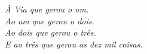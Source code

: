 \begin{dedicatoria}
   \vspace*{\fill}
   \vspace*{\fill}
   \vspace*{\fill}
   \vspace*{\fill}
   \vspace*{\fill}
   \vspace*{\fill}
   \vspace*{\fill}
   \vspace*{\fill}
   \vspace*{\fill}
   \vspace*{\fill}
   \vspace*{\fill}
   \vspace*{\fill}
   \begin{center}\textit{À Via que gerou o um.\\Ao um que gerou o dois.\\Ao dois que gerou o três.\\E ao tr\^es que gerou as dez mil coisas.}\end{center}
   \vspace*{\fill}
   \vspace*{\fill}
   \vspace*{\fill}
   \vspace*{\fill}
   \vspace*{\fill}
   \vspace*{\fill}
   \vspace*{\fill}
   \vspace*{\fill}
   \vspace*{\fill}
   \vspace*{\fill}
   \vspace*{\fill}
   \vspace*{\fill}
   \vspace*{\fill}
   \vspace*{\fill}
   \vspace*{\fill}
   \centering
   \noindent
   \vspace*{\fill}
\end{dedicatoria}